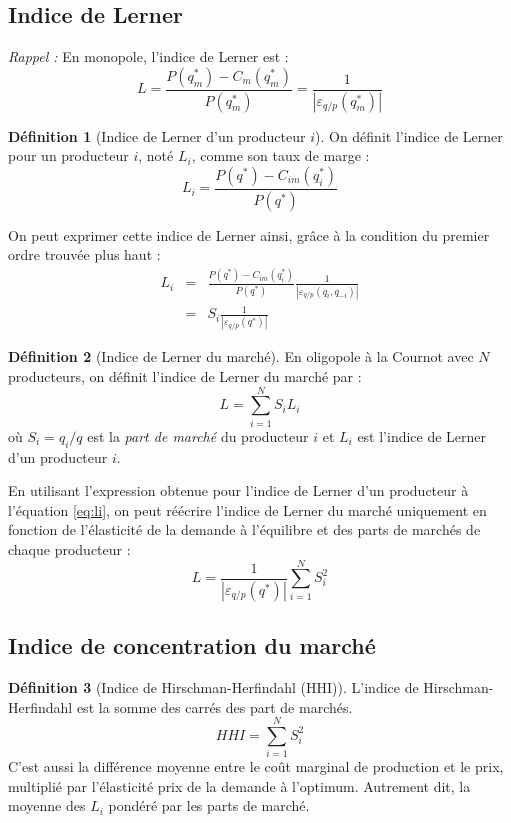 \documentclass[
  a4paper,
]{book}
\theoremstyle{definition}
\newtheorem{definition}{Définition}[chapter]
\theoremstyle{definition}
\theoremstyle{definition}
\theoremstyle{definition}
\theoremstyle{remark}
\begin{document}
\hypertarget{indice-de-lerner}{%
\subsection{Indice de Lerner}\label{indice-de-lerner}}

\emph{Rappel :} En monopole, l'indice de Lerner est :
\[L=\frac{P(q_m^*)-C_m(q_m^*)}{P(q_m^*)} = \frac{1}{\left|\varepsilon_{q/p}(q_m^*)\right|}\]

\begin{definition}[Indice de Lerner d'un producteur $i$]
On définit l'indice de Lerner pour un producteur \(i\), noté \(L_i\), comme son taux de marge :
\[L_i=\frac{P(q^*) -C_{im}(q^*_i)}{P(q^*)}\]
\end{definition}

On peut exprimer cette indice de Lerner ainsi, grâce à la condition du premier ordre trouvée plus haut :
\begin{equation}
\begin{array}{rcl}
L_i &=&\frac{P(q^*)-C_{im}(q_i^*)}{P(q^*)}\frac{1}{\left|\varepsilon_{q/p}(q_i, q_{-i})\right|}\\
&=&S_i\frac{1}{\left|\varepsilon_{q/p}(q^*)\right|}
\end{array}
\label{eq:li}
\end{equation}

\begin{definition}[Indice de Lerner du marché]
En oligopole à la Cournot avec \(N\) producteurs, on définit l'indice de Lerner du marché par :
\[L = \sum_{i=1}^NS_iL_i\]
où \(S_i=q_i/q\) est la \emph{part de marché} du producteur \(i\) et \(L_i\) est l'indice de Lerner d'un producteur \(i\).
\end{definition}

En utilisant l'expression obtenue pour l'indice de Lerner d'un producteur à l'équation \eqref{eq:li}, on peut réécrire l'indice de Lerner du marché uniquement en fonction de l'élasticité de la demande à l'équilibre et des parts de marchés de chaque producteur :
\[
L=\frac{1}{\left|\varepsilon_{q/p}(q^*)\right|}\sum_{i=1}^NS_i^2
\]

\hypertarget{indice-de-concentration-du-marchuxe9}{%
\subsection{Indice de concentration du marché}\label{indice-de-concentration-du-marchuxe9}}

\begin{definition}[Indice de Hirschman-Herfindahl (HHI)]
\protect\hypertarget{def:HHI}{}\label{def:HHI}L'indice de Hirschman-Herfindahl est la somme des carrés des part de marchés.
\[HHI = \sum_{i=1}^NS_i^2\]
C'est aussi la différence moyenne entre le coût marginal de production et le prix, multiplié par l'élasticité prix de la demande à l'optimum.
Autrement dit, la moyenne des \(L_i\) pondéré par les parts de marché.
\end{definition}
\end{document}
